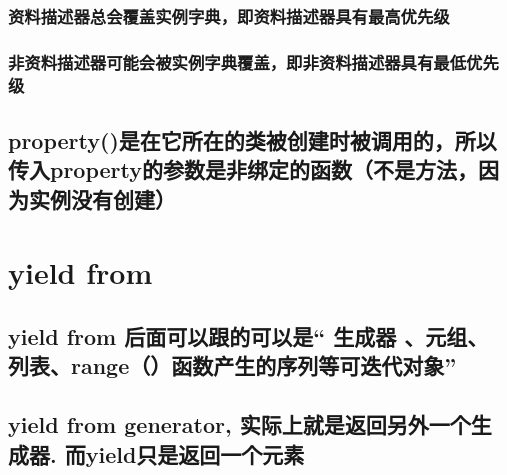\documentclass[11pt]{article}
\begin{document}
\subsubsection{资料描述器总会覆盖实例字典，即资料描述器具有最高优先级}
\label{sec:org307d7c3}
\subsubsection{非资料描述器可能会被实例字典覆盖，即非资料描述器具有最低优先级}
\label{sec:org12c456b}

\subsection{property()是在它所在的类被创建时被调用的，所以传入property的参数是非绑定的函数（不是方法，因为实例没有创建）}
\label{sec:org24e0d17}

\section{yield from}
\label{sec:orge79e9cd}
\subsection{yield from 后面可以跟的可以是“ 生成器 、元组、 列表、range（）函数产生的序列等可迭代对象”}
\label{sec:org4d289cd}
\subsection{yield from  generator, 实际上就是返回另外一个生成器. 而yield只是返回一个元素}
\label{sec:org33cab4a}
\end{document}
